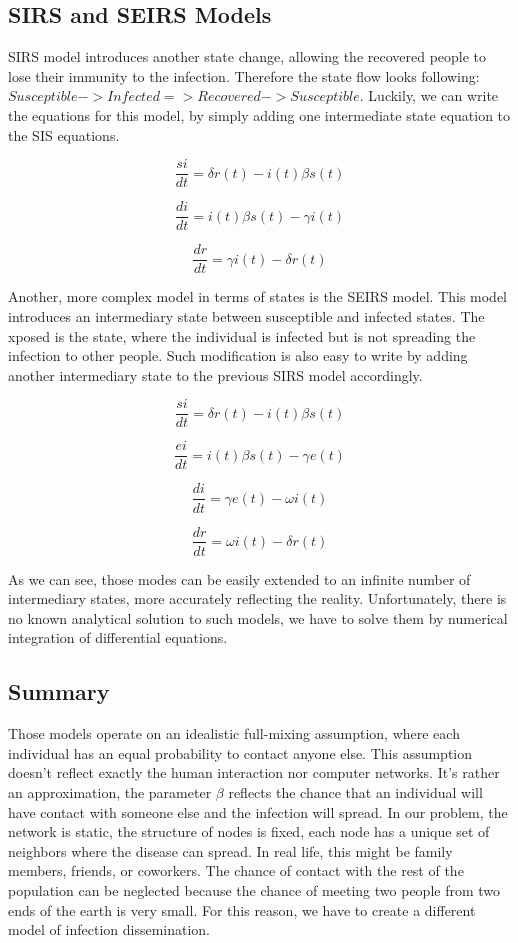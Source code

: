 \documentclass[nostrict]{szablonPG}
\begin{document}
\subsection{SIRS and SEIRS Models}
SIRS model introduces another state change, allowing the recovered people to lose their immunity to the infection. Therefore the state flow looks following: $Susceptible -> Infected => Recovered -> Susceptible$. Luckily, we can write the equations for this model, by simply adding one intermediate state equation to the SIS equations.

\[\frac{si}{dt} = \delta r(t) - i(t) \beta s(t)\]

\[\frac{di}{dt} = i(t) \beta s(t) - \gamma i(t)\]

\[\frac{dr}{dt} = \gamma i(t) - \delta r(t)\]


Another, more complex model in terms of states is the SEIRS model. This model introduces an intermediary state between susceptible and infected states. The xposed is the state, where the individual is infected but is not spreading the infection to other people. Such modification is also easy to write by adding another intermediary state to the previous SIRS model accordingly.

\[\frac{si}{dt} = \delta r(t) - i(t) \beta s(t)\]

\[\frac{ei}{dt} = i(t) \beta s(t) - \gamma e(t)\]

\[\frac{di}{dt} = \gamma e(t) - \omega i(t)\]

\[\frac{dr}{dt} = \omega i(t) - \delta r(t)\]

As we can see, those modes can be easily extended to an infinite number of intermediary states, more accurately reflecting the reality. Unfortunately, there is no known analytical solution to such models, we have to solve them by numerical integration of differential equations.

\subsection{Summary}
Those models operate on an idealistic full-mixing assumption, where each individual has an equal probability to contact anyone else. This assumption doesn't reflect exactly the human interaction nor computer networks. It's rather an approximation, the parameter $\beta$ reflects the chance that an individual will have contact with someone else and the infection will spread. In our problem, the network is static, the structure of nodes is fixed, each node has a unique set of neighbors where the disease can spread. In real life, this might be family members, friends, or coworkers. The chance of contact with the rest of the population can be neglected because the chance of meeting two people from two ends of the earth is very small. For this reason, we have to create a different model of infection dissemination. 
\end{document}
